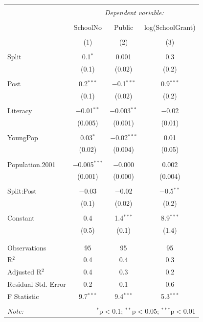 \documentclass[12pt, a4paper]{article}
\begin{document}
\begin{table}[!htbp] \centering 
	\caption{} 
	\label{} 
	\begin{tabular}{@{\extracolsep{5pt}}lccc} 
		\\[-1.8ex]\hline 
		\hline \\[-1.8ex] 
		& \multicolumn{3}{c}{\textit{Dependent variable:}} \\ 
		\cline{2-4} 
		\\[-1.8ex] & SchoolNo & Public & log(SchoolGrant) \\ 
		\\[-1.8ex] & (1) & (2) & (3)\\ 
		\hline \\[-1.8ex] 
		Split & 0.1$^{*}$ & 0.001 & 0.3 \\ 
		& (0.1) & (0.02) & (0.2) \\ 
		& & & \\ 
		Post & 0.2$^{***}$ & $-$0.1$^{***}$ & 0.9$^{***}$ \\ 
		& (0.1) & (0.02) & (0.2) \\ 
		& & & \\ 
		Literacy & $-$0.01$^{**}$ & $-$0.003$^{**}$ & $-$0.02 \\ 
		& (0.005) & (0.001) & (0.01) \\ 
		& & & \\ 
		YoungPop & 0.03$^{*}$ & $-$0.02$^{***}$ & 0.01 \\ 
		& (0.02) & (0.004) & (0.05) \\ 
		& & & \\ 
		Population.2001 & $-$0.005$^{***}$ & $-$0.000 & 0.002 \\ 
		& (0.001) & (0.000) & (0.004) \\ 
		& & & \\ 
		Split:Post & $-$0.03 & $-$0.02 & $-$0.5$^{**}$ \\ 
		& (0.1) & (0.02) & (0.2) \\ 
		& & & \\ 
		Constant & 0.4 & 1.4$^{***}$ & 8.9$^{***}$ \\ 
		& (0.5) & (0.1) & (1.4) \\ 
		& & & \\ 
		\hline \\[-1.8ex] 
		Observations & 95 & 95 & 95 \\ 
		R$^{2}$ & 0.4 & 0.4 & 0.3 \\ 
		Adjusted R$^{2}$ & 0.4 & 0.3 & 0.2 \\ 
		Residual Std. Error & 0.2 & 0.1 & 0.6 \\ 
		F Statistic & 9.7$^{***}$ & 9.4$^{***}$ & 5.3$^{***}$ \\ 
		\hline 
		\hline \\[-1.8ex] 
		\textit{Note:}  & \multicolumn{3}{r}{$^{*}$p$<$0.1; $^{**}$p$<$0.05; $^{***}$p$<$0.01} \\ 
	\end{tabular} 
\end{table} %
\end{document}

